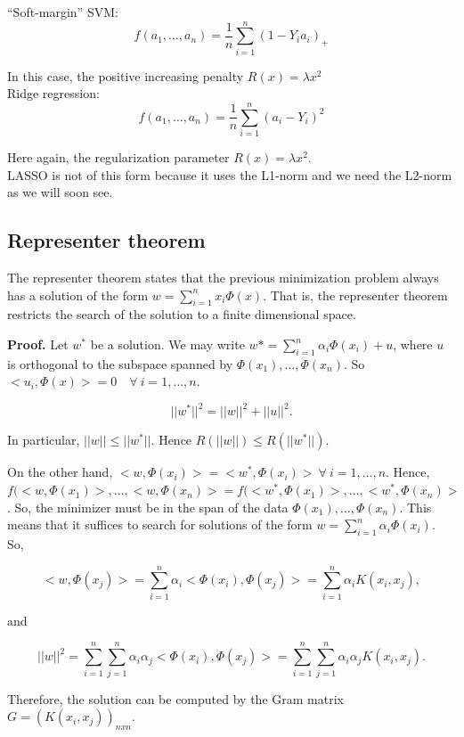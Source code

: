 \documentclass[11pt, english]{article}
\begin{document}
``Soft-margin'' SVM:
$$
f(a_1,\dots,a_n) = \frac{1}{n} \sum_{i=1}^{n}(1 - Y_ia_i)_+
$$

In this case, the positive increasing penalty $R(x) = \lambda x^2$\\

Ridge regression:
$$
f(a_1, \dots, a_n) = \frac{1}{n} \sum_{i=1}^{n}(a_i - Y_i)^2
$$

Here again, the regularization parameter $R(x) = \lambda x^2$.\\

LASSO is not of this form because it uses the L1-norm and we need the L2-norm as we will soon see.

\subsection{Representer theorem}

The representer theorem states that the previous minimization problem always has a solution of the form $w = \sum_{i=1}^{n} x_i \Phi(x)$. That is, the representer theorem restricts the search of the solution to a finite dimensional space.

\textbf{Proof.} Let $w^*$ be a solution. We may write $w* = \sum_{i=1}^{n}\alpha_i \Phi(x_i) + u$, where $u$ is orthogonal to the subspace spanned by $\Phi(x_1),\dots, \Phi(x_n)$. So $<u_i, \Phi(x)> = 0 \quad \forall \ i=1,\dots,n$.

\begin{equation}
||w^*||^2 = ||w||^2 + ||u||^2.
\end{equation}


In particular, $||w|| \leq ||w^*||$. Hence $R(||w||) \leq R(||w^*||).$

On the other hand, $<w,\Phi(x_i)> = <w^*, \Phi(x_i)> \ \forall \ i = 1,\dots, n$. Hence, $f(<w,\Phi(x_1)>, \dots, <w, \Phi (x_n)> = f(<w^*,\Phi(x_1)>, \dots, <w^*, \Phi (x_n)>$. So, the minimizer must be in the span of the data $\Phi(x_1), \dots, \Phi(x_n)$. This means that it suffices to search for solutions of the form $w = \sum_{i=1}^{n}\alpha_i \Phi(x_i)$. So,

\begin{equation}
<w,\Phi(x_j)> = \sum_{i=1}^{n} \alpha_i <\Phi(x_i), \Phi(x_j)> = \sum_{i=1}^{n}\alpha_i K(x_i, x_j),
\end{equation}

and

\begin{equation}
||w||^2 = \sum_{i=1}^{n} \sum_{j=1}^{n} \alpha_i \alpha_j <\Phi(x_i), \Phi(x_j)> = \sum_{i=1}^{n}\sum_{j=1}^{n} \alpha_i \alpha_j K(x_i, x_j).
\end{equation}

Therefore, the solution can be computed by the Gram matrix $G = (K(x_i,x_j))_{nxn}$.

 
\end{document}
